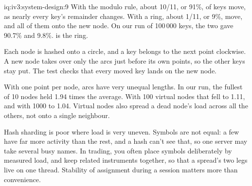 \begin{solution}{iq:iv3:system-design:9}
With the modulo rule, about 10/11, or 91\%, of keys move, as nearly every key's remainder changes. With a ring, about 1/11, or 9\%, move, and all of them onto the new node. On our run of 100\,000 keys, the two gave 90.7\% and 9.8\%.  is the ring.
\label{lst:iv3:sd:ring}

Each node is hashed onto a circle, and a key belongs to the next point clockwise. A new node takes over only the arcs just before its own points, so the other keys stay put. The test checks that every moved key lands on the new node.

With one point per node, arcs have very unequal lengths. In our run, the fullest of 10 nodes held 1.94 times the average. With 100 virtual nodes that fell to 1.11, and with 1000 to 1.04. Virtual nodes also spread a dead node's load across all the others, not onto a single neighbour.

Hash sharding is poor where load is very uneven. Symbols are not equal: a few have far more activity than the rest, and a hash can't see that, so one server may take several busy names. In trading, you often place symbols deliberately by measured load, and keep related instruments together, so that a spread's two legs live on one thread. Stability of assignment during a session matters more than convenience.

\end{solution}

